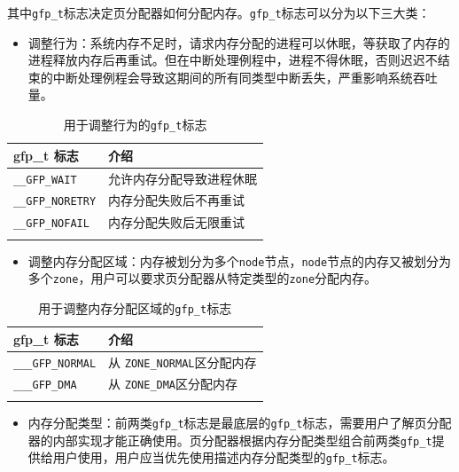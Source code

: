 \documentclass[AutoFakeBold]{LZUThesis}
\newcommand{\tightlist}{%
  \setlength{\itemsep}{0pt}\setlength{\parskip}{0pt}}
\begin{document}
\begin{sloppypar}
其中\texttt{gfp\_t}标志决定页分配器如何分配内存。\texttt{gfp\_t}标志可以分为以下三大类：

\begin{itemize}
\tightlist
\item
  调整行为：系统内存不足时，请求内存分配的进程可以休眠，等获取了内存的进程释放内存后再重试。但在中断处理例程中，进程不得休眠，否则迟迟不结束的中断处理例程会导致这期间的所有同类型中断丢失，严重影响系统吞吐量。
\end{itemize}

\begin{longtable}[]{@{}ll@{}}
\toprule\noalign{}
gfp\_t 标志 & 介绍 \\
\midrule\noalign{}
\endhead
\bottomrule\noalign{}
\endlastfoot
\texttt{\_\_GFP\_WAIT} & 允许内存分配导致进程休眠 \\
\texttt{\_\_GFP\_NORETRY} & 内存分配失败后不再重试 \\
\texttt{\_\_GFP\_NOFAIL} & 内存分配失败后无限重试 \\
\caption{用于调整行为的\texttt{gfp\_t}标志}
\label{table:gfp-action-modifier}
\end{longtable}

\begin{itemize}
\tightlist
\item
  调整内存分配区域：内存被划分为多个\texttt{node}节点，\texttt{node}节点的内存又被划分为多个\texttt{zone}，用户可以要求页分配器从特定类型的\texttt{zone}分配内存。
\end{itemize}

\begin{longtable}[]{@{}ll@{}}
\toprule\noalign{}
gfp\_t 标志 & 介绍 \\
\midrule\noalign{}
\endhead
\bottomrule\noalign{}
\endlastfoot
\texttt{\_\_\_GFP\_NORMAL} & 从 \texttt{ZONE\_NORMAL}区分配内存 \\
\texttt{\_\_\_GFP\_DMA} & 从 \texttt{ZONE\_DMA}区分配内存 \\
\caption{用于调整内存分配区域的\texttt{gfp\_t}标志}
\label{table:gfp-zone-modifier}
\end{longtable}

\begin{itemize}
\tightlist
\item
  内存分配类型：前两类\texttt{gfp\_t}标志是最底层的\texttt{gfp\_t}标志，需要用户了解页分配器的内部实现才能正确使用。页分配器根据内存分配类型组合前两类\texttt{gfp\_t}提供给用户使用，用户应当优先使用描述内存分配类型的\texttt{gfp\_t}标志。
\end{itemize}


\end{sloppypar}
\end{document}
